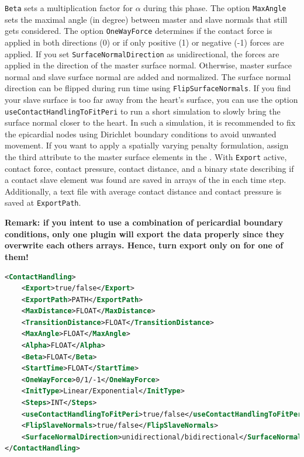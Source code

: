 \verb|Beta| sets a multiplication factor for $\alpha$ during this phase.
The option \verb|MaxAngle| sets the maximal angle (in \si{degree}) between master and slave normals that still gets considered.
The option \verb|OneWayForce| determines if the contact force is applied in both directions (0) or if only positive (1) or negative (-1) forces are applied.
If you set \verb|SurfaceNormalDirection| as unidirectional, the forces are applied in the direction of the master surface normal.
Otherwise, master surface normal and slave surface normal are added and normalized.
The surface normal direction can be flipped during run time using \verb|FlipSurfaceNormals|.
If you find your slave surface is too far away from the heart's surface, you can use the option \verb|useContactHandlingToFitPeri| to run a short simulation to slowly bring the surface normal closer to the heart.
In such a simulation, it is recommended to fix the epicardial nodes using Dirichlet boundary conditions to avoid unwanted movement.
If you want to apply a spatially varying penalty formulation, assign the third attribute to the master surface elements in the .
With \verb|Export| active, contact force, contact pressure, contact distance, and a binary state describing if a contact slave element was found are saved in arrays of the  in each time step.
Additionally, a text file with average contact distance and contact pressure is saved at \verb|ExportPath|.

\textbf{Remark: if you intent to use a combination of pericardial boundary conditions, only one plugin will export the data properly since they overwrite each others arrays. Hence, turn export only on for one of them!}

\begin{lstlisting}[language=XML,caption=.xml settings for ContactHandling plugin]
<ContactHandling>
    <Export>true/false</Export>
    <ExportPath>PATH</ExportPath>
    <MaxDistance>FLOAT</MaxDistance>
    <TransitionDistance>FLOAT</TransitionDistance>
    <MaxAngle>FLOAT</MaxAngle>
    <Alpha>FLOAT</Alpha>
    <Beta>FLOAT</Beta>
    <StartTime>FLOAT</StartTime>
    <OneWayForce>0/1/-1</OneWayForce>
    <InitType>Linear/Exponential</InitType>
    <Steps>INT</Steps>
    <useContactHandlingToFitPeri>true/false</useContactHandlingToFitPeri>
    <FlipSlaveNormals>true/false</FlipSlaveNormals>
    <SurfaceNormalDirection>unidirectional/bidirectional</SurfaceNormalDirection>
</ContactHandling>
\end{lstlisting}

